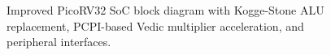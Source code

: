 \begin{figure}[htbp]
\caption{Improved PicoRV32 SoC block diagram with Kogge-Stone ALU replacement, PCPI-based Vedic multiplier acceleration, and peripheral interfaces.}
\label{fig:soc_architecture}
\end{figure}
